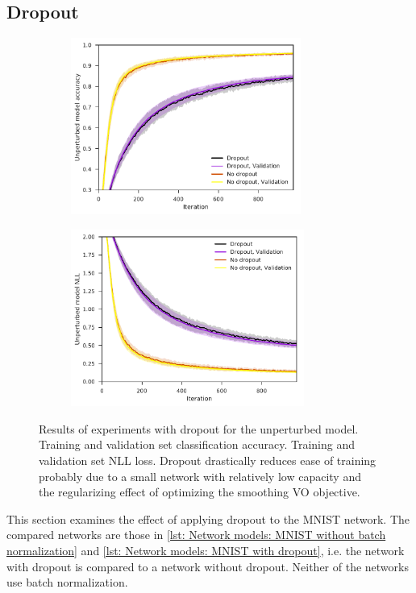 \subsection{Dropout}\label{sec: Experimental work: Dropout}
\begin{figure}[tbp!]
    \begin{subfigure}[b]{0.49\textwidth}
        \centering
        \includegraphics[height=5.8cm]{graphics/E024-DO-SGD-analysis/accuracy_unp-all-series-mean-sd.pdf}
        \caption{}
        \label{fig: Theory: E024-DO-SGD-analysis/accuracy_unp-all-series-mean-sd}
    \end{subfigure}
    \hfill
    \begin{subfigure}[b]{0.49\textwidth}
        \centering
        \includegraphics[height=5.8cm]{graphics/E024-DO-SGD-analysis/return_unp-all-series-mean-sd.pdf}
        \caption{}
        \label{fig: Theory: E024-DO-SGD-analysis/return_unp-all-series-mean-sd}
    \end{subfigure}
    \caption{
        Results of experiments with dropout for the unperturbed model.
         Training and validation set classification accuracy.
         Training and validation set \gls{NLL} loss. Dropout drastically reduces ease of training probably due to a small network with relatively low capacity and the regularizing effect of optimizing the smoothing \gls{VO} objective.
    }
    \label{fig: Theory: E024-DO-SGD-analysis}
\end{figure}
This section examines the effect of applying dropout to the \gls{MNIST} network. The compared networks are those in \autoref{lst: Network models: MNIST without batch normalization} and \autoref{lst: Network models: MNIST with dropout}, i.e. the network with dropout is compared to a network without dropout. Neither of the networks use batch normalization.

